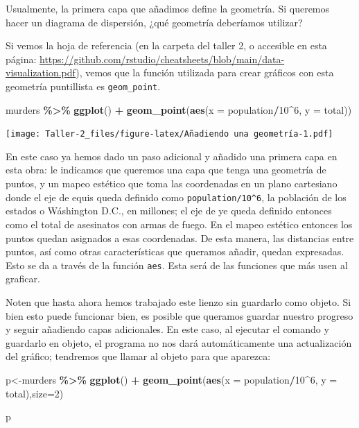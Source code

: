 \documentclass[
]{article}
\newenvironment{Shaded}{\begin{snugshade}}{\end{snugshade}}
\newcommand{\AttributeTok}[1]{\textcolor[rgb]{0.13,0.29,0.53}{#1}}
\newcommand{\DecValTok}[1]{\textcolor[rgb]{0.00,0.00,0.81}{#1}}
\newcommand{\FunctionTok}[1]{\textcolor[rgb]{0.13,0.29,0.53}{\textbf{#1}}}
\newcommand{\NormalTok}[1]{#1}
\newcommand{\OtherTok}[1]{\textcolor[rgb]{0.56,0.35,0.01}{#1}}
\newcommand{\SpecialCharTok}[1]{\textcolor[rgb]{0.81,0.36,0.00}{\textbf{#1}}}
\begin{document}
Usualmente, la primera capa que añadimos define la geometría. Si
queremos hacer un diagrama de dispersión, ¿qué geometría deberíamos
utilizar?

Si vemos la hoja de referencia (en la carpeta del taller 2, o accesible
en esta página:
\url{https://github.com/rstudio/cheatsheets/blob/main/data-visualization.pdf}),
vemos que la función utilizada para crear gráficos con esta geometría
puntillista es \texttt{geom\_point}.

\begin{Shaded}
\begin{Highlighting}[]
\NormalTok{murders }\SpecialCharTok{\%\textgreater{}\%}
  \FunctionTok{ggplot}\NormalTok{() }\SpecialCharTok{+}
  \FunctionTok{geom\_point}\NormalTok{(}\FunctionTok{aes}\NormalTok{(}\AttributeTok{x =}\NormalTok{ population}\SpecialCharTok{/}\DecValTok{10}\SpecialCharTok{\^{}}\DecValTok{6}\NormalTok{, }\AttributeTok{y =}\NormalTok{ total))}
\end{Highlighting}
\end{Shaded}

\texttt{[image: Taller-2\_files/figure-latex/Añadiendo una geometría-1.pdf]}

En este caso ya hemos dado un paso adicional y añadido una primera capa
en esta obra: le indicamos que queremos una capa que tenga una geometría
de puntos, y un mapeo estético que toma las coordenadas en un plano
cartesiano donde el eje de equis queda definido como
\texttt{population/10\^{}6}, la población de los estados o Wáshington
D.C., en millones; el eje de ye queda definido entonces como el total de
asesinatos con armas de fuego. En el mapeo estético entonces los puntos
quedan asignados a esas coordenadas. De esta manera, las distancias
entre puntos, así como otras características que queramos añadir, quedan
expresadas. Esto se da a través de la función \texttt{aes}. Esta será de
las funciones que más usen al graficar.

Noten que hasta ahora hemos trabajado este lienzo sin guardarlo como
objeto. Si bien esto puede funcionar bien, es posible que queramos
guardar nuestro progreso y seguir añadiendo capas adicionales. En este
caso, al ejecutar el comando y guardarlo en objeto, el programa no nos
dará automáticamente una actualización del gráfico; tendremos que llamar
al objeto para que aparezca:

\begin{Shaded}
\begin{Highlighting}[]
\NormalTok{p}\OtherTok{\textless{}{-}}\NormalTok{murders }\SpecialCharTok{\%\textgreater{}\%}
  \FunctionTok{ggplot}\NormalTok{() }\SpecialCharTok{+}
  \FunctionTok{geom\_point}\NormalTok{(}\FunctionTok{aes}\NormalTok{(}\AttributeTok{x =}\NormalTok{ population}\SpecialCharTok{/}\DecValTok{10}\SpecialCharTok{\^{}}\DecValTok{6}\NormalTok{, }\AttributeTok{y =}\NormalTok{ total),}\AttributeTok{size=}\DecValTok{2}\NormalTok{)}

\NormalTok{p}
\end{Highlighting}
\end{Shaded}
\end{document}
